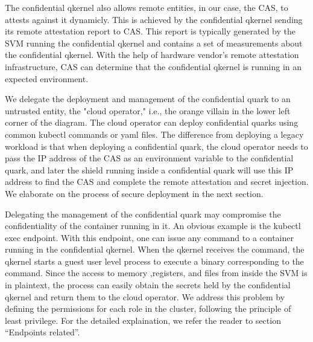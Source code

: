 The confidential qkernel also allows remote entities, in our case, the CAS, to attests against it dynamicly. This is achieved by the confidential qkernel sending its remote attestation report to CAS. 
This report is typically generated by the SVM running the confidential qkernel and contains a set of measurements about the confidential qkernel. With the help of hardware vendor's remote attestation infrastructure, CAS can determine that the 
confidential qkernel is running in an expected environment.

We delegate the deployment and management of the confidential quark to an untrusted entity, the "cloud operator," i.e., the orange villain in the lower left corner of the diagram. The cloud operator can deploy confidential quarks using 
common kubectl commands or yaml files. The difference from deploying a legacy workload is that when deploying a confidential quark, the cloud operator needs to pass 
the IP address of the CAS as an environment variable to the confidential quark, and later the shield running inside a confidential quark will use this IP address to find the CAS and complete the remote attestation and secret injection. We elaborate on the process of secure deployment in the next section.

Delegating the management of the confidential quark may compromise the confidentiality of the container running in it.  An obvious example is the kubectl exec endpoint. With this endpoint, one can issue any command to a container running in the confidential qkernel. 
When the qkernel receives the command, the qkernel starts a guest user level process to execute a binary corresponding to the command. Since the access to memory ,registers, and files from inside the SVM is in plaintext, the process can easily obtain 
the secrets held by the confidential qkernel and return them to the cloud operator. We address this problem by defining the permissions for each role in the cluster, following the principle of least privilege. 
For the detailed explaination, we refer the reader to section “Endpoints related”.




